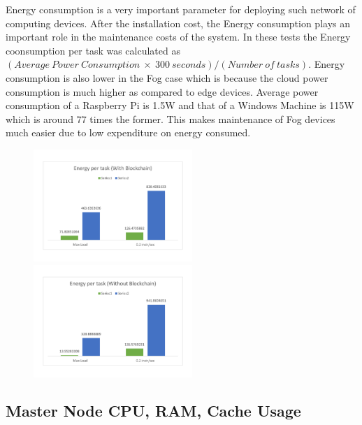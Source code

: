\documentclass[10pt,journal,compsoc]{IEEEtran}
\begin{document}
Energy consumption is a very important parameter for deploying such network of computing devices. After the installation cost, the Energy consumption plays an important role in the maintenance costs of the system. In these tests the Energy coonsumption per task was calculated as $(Average\ Power\ Consumption\ \times\ 300\ seconds)/(Number\ of\ tasks)$. Energy consumption is also lower in the Fog case which is because the cloud power consumption is much higher as compared to edge devices. Average power consumption of a Raspberry Pi is 1.5W and that of a Windows Machine is 115W which is around 77 times the former. This makes maintenance of Fog devices much easier due to low expenditure on energy consumed. 
\begin{figure}[h]
\centering
\includegraphics[width=6cm]{g31} \ \ \ \ \ \ \ \ \ \ \       
\includegraphics[width=6cm]{g32}
\end{figure}

\subsection{Master Node CPU, RAM, Cache Usage}
\end{document}
